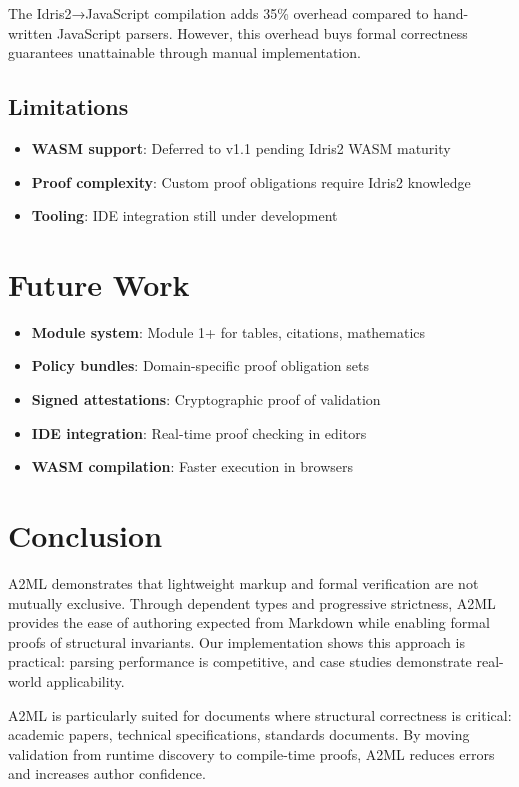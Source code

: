 \documentclass[10pt,twocolumn]{article}
\begin{document}
The Idris2→JavaScript compilation adds 35\% overhead compared to hand-written JavaScript parsers. However, this overhead buys formal correctness guarantees unattainable through manual implementation.

\subsection{Limitations}

\begin{itemize}
  \item \textbf{WASM support}: Deferred to v1.1 pending Idris2 WASM maturity
  \item \textbf{Proof complexity}: Custom proof obligations require Idris2 knowledge
  \item \textbf{Tooling}: IDE integration still under development
\end{itemize}

\section{Future Work}

\begin{itemize}
  \item \textbf{Module system}: Module 1+ for tables, citations, mathematics
  \item \textbf{Policy bundles}: Domain-specific proof obligation sets
  \item \textbf{Signed attestations}: Cryptographic proof of validation
  \item \textbf{IDE integration}: Real-time proof checking in editors
  \item \textbf{WASM compilation}: Faster execution in browsers
\end{itemize}

\section{Conclusion}

A2ML demonstrates that lightweight markup and formal verification are not mutually exclusive. Through dependent types and progressive strictness, A2ML provides the ease of authoring expected from Markdown while enabling formal proofs of structural invariants. Our implementation shows this approach is practical: parsing performance is competitive, and case studies demonstrate real-world applicability.

A2ML is particularly suited for documents where structural correctness is critical: academic papers, technical specifications, standards documents. By moving validation from runtime discovery to compile-time proofs, A2ML reduces errors and increases author confidence.
\end{document}
